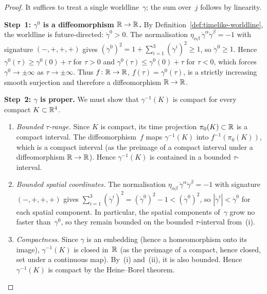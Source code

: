 \begin{proof}
  It suffices to treat a single worldline~$\gamma$; the sum
  over~$j$ follows by linearity.

  \medskip\noindent
  \textbf{Step~1: $\gamma^0$ is a diffeomorphism
  $\mathbb{R}\to\mathbb{R}$.}\;
  By Definition~\ref{def:timelike-worldline}, the worldline is
  future-directed:
  $\dot\gamma^0 > 0$.  The normalisation
  $\eta_{\alpha\beta}\,\dot\gamma^\alpha\dot\gamma^\beta = -1$
  with signature $(-,+,+,+)$ gives
  $(\dot\gamma^0)^2 = 1 + \sum_{i=1}^{3}(\dot\gamma^i)^2 \geq 1$,
  so $\dot\gamma^0 \geq 1$.  Hence $\gamma^0(\tau) \geq \gamma^0(0) + \tau$
  for $\tau > 0$ and $\gamma^0(\tau) \leq \gamma^0(0) + \tau$ for
  $\tau < 0$, which forces $\gamma^0 \to \pm\infty$ as
  $\tau\to\pm\infty$.  Thus $f\colon \mathbb{R}\to\mathbb{R}$,
  $f(\tau) = \gamma^0(\tau)$, is a strictly increasing smooth
  surjection and therefore a diffeomorphism $\mathbb{R}\to\mathbb{R}$.

  \medskip\noindent
  \textbf{Step~2: $\gamma$ is proper.}\;
  We must show that $\gamma^{-1}(K)$ is compact for every compact
  $K\subset\mathbb{R}^{4}$.
  \begin{enumerate}
    \item[(i)] \emph{Bounded $\tau$-range.}\;
      Since $K$ is compact, its time projection
      $\pi_0(K) \subset \mathbb{R}$ is a compact interval.  The
      diffeomorphism~$f$ maps $\gamma^{-1}(K)$ into
      $f^{-1}(\pi_0(K))$, which is a compact interval (as the
      preimage of a compact interval under a diffeomorphism
      $\mathbb{R}\to\mathbb{R}$).  Hence $\gamma^{-1}(K)$ is contained in a
      bounded $\tau$-interval.
    \item[(ii)] \emph{Bounded spatial coordinates.}\;
      The normalisation
      $\eta_{\alpha\beta}\,\dot\gamma^\alpha\dot\gamma^\beta = -1$
      with signature $(-,+,+,+)$ gives
      $\sum_{i=1}^{3}(\dot\gamma^i)^2 = (\dot\gamma^0)^2 - 1
      < (\dot\gamma^0)^2$,
      so $|\dot\gamma^i| < \dot\gamma^0$ for each spatial
      component.  In particular, the spatial components of~$\gamma$
      grow no faster than~$\gamma^0$, so they remain bounded on
      the bounded $\tau$-interval from~(i).
    \item[(iii)] \emph{Compactness.}\;
      Since $\gamma$ is an embedding (hence a homeomorphism onto
      its image), $\gamma^{-1}(K)$ is closed in~$\mathbb{R}$ (as the
      preimage of a compact, hence closed, set under a continuous
      map).  By~(i) and~(ii), it is also bounded.  Hence
      $\gamma^{-1}(K)$ is compact by the Heine--Borel theorem.
  \end{enumerate}


\end{proof}
